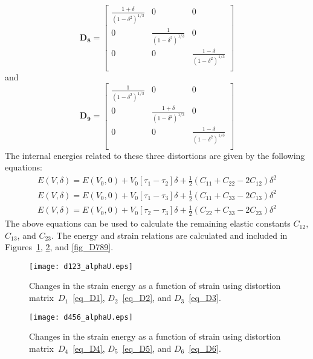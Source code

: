 \begin{equation}\label{eq_D8}
						\mathbf{D_8} =  \begin{bmatrix}
						\frac{1+\delta}{(1-\delta^2)^{1/3}} & 0 & 0 \\
						0 & \frac{1}{(1-\delta^2)^{1/3}} & 0 \\
						0 & 0 & \frac{1-\delta}{(1-\delta^2)^{1/3}} \\
						\end{bmatrix}
\end{equation}	
and
\begin{equation}\label{eq_D9}
						\mathbf{D_9} = \begin{bmatrix}
						\frac{1}{(1-\delta^2)^{1/3}} & 0 & 0 \\
						0 & \frac{1+\delta}{(1-\delta^2)^{1/3}} & 0 \\
						0 & 0 & \frac{1-\delta}{(1-\delta^2)^{1/3}} \\	
						\end{bmatrix}
\end{equation}
The internal energies related to these three distortions are given by the following equations:
\begin{gather}
E(V,\delta) = E(V_0, 0) + V_0\left [ \tau_1 - \tau_2 \right ] \delta + \frac{1}{2} \left(C_{11} + C_{22} -2C_{12}  \right)\delta^2 \\
E(V,\delta) = E(V_0, 0) + V_0\left [ \tau_1 - \tau_3 \right ] \delta + \frac{1}{2} \left(C_{11} + C_{33} -2C_{13}  \right)\delta^2 \\
E(V,\delta) = E(V_0, 0) + V_0\left [ \tau_2 - \tau_3 \right ] \delta + \frac{1}{2} \left(C_{22} + C_{33} -2C_{23}  \right)\delta^2
\end{gather}
The above equations can be used to calculate the remaining elastic constants $C_{12}$, $C_{13}$, and $C_{23}$\@. The energy and strain relations are calculated and included in Figures~\ref{fig_D123}, \ref{fig_D456}, and \ref{fig_D789}\@. 

\begin{figure}
	\centering
	\texttt{[image: d123\_alphaU.eps]}
	\caption{Changes in the strain energy as a function of strain using distortion matrix~$D_1$~\eqref{eq_D1}, $D_2$~\eqref{eq_D2}, and $D_3$~\eqref{eq_D3}.}
	\label{fig_D123}
\end{figure}

\begin{figure}
	\centering
	\texttt{[image: d456\_alphaU.eps]}
	\caption{Changes in the strain energy as a function of strain using distortion matrix~$D_4$~\eqref{eq_D4}, $D_5$~\eqref{eq_D5}, and $D_6$~\eqref{eq_D6}.}
	\label{fig_D456}
\end{figure}

